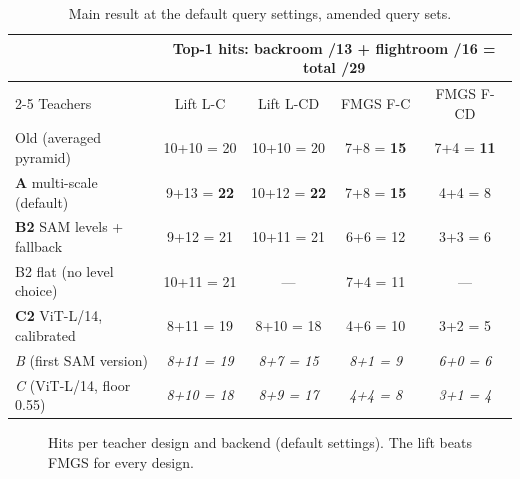\documentclass[11pt,a4paper]{article}
\begin{document}
\begin{table}[ht]
\centering\small
\begin{tabular}{@{}lcccc@{}}
\toprule
 & \multicolumn{4}{c}{Top-1 hits: backroom /13 + flightroom /16 = total /29} \\
\cmidrule(l){2-5}
Teachers & Lift L-C & Lift L-CD & FMGS F-C & FMGS F-CD \\
\midrule
Old (averaged pyramid)            & 10+10 = 20 & 10+10 = 20 & 7+8 = \textbf{15} & 7+4 = \textbf{11} \\
\textbf{A} multi-scale (default)  & 9+13 = \textbf{22} & 10+12 = \textbf{22} & 7+8 = \textbf{15} & 4+4 = 8 \\
\textbf{B2} SAM levels + fallback & 9+12 = 21 & 10+11 = 21 & 6+6 = 12 & 3+3 = 6 \\
\quad B2 flat (no level choice)   & 10+11 = 21 & --- & 7+4 = 11 & --- \\
\textbf{C2} ViT-L/14, calibrated  & 8+11 = 19 & 8+10 = 18 & 4+6 = 10 & 3+2 = 5 \\
\midrule
\textit{B} (first SAM version)    & \textit{8+11 = 19} & \textit{8+7 = 15} & \textit{8+1 = 9} & \textit{6+0 = 6} \\
\textit{C} (ViT-L/14, floor 0.55) & \textit{8+10 = 18} & \textit{8+9 = 17} & \textit{4+4 = 8} & \textit{3+1 = 4} \\
\bottomrule
\end{tabular}
\caption{Main result at the default query settings, amended query sets.}
\label{tab:main}
\end{table}

\begin{figure}[ht]
\centering
{}
\caption{Hits per teacher design and backend (default settings). The lift beats FMGS for every design.}
\label{fig:bars}
\end{figure}
\end{document}
